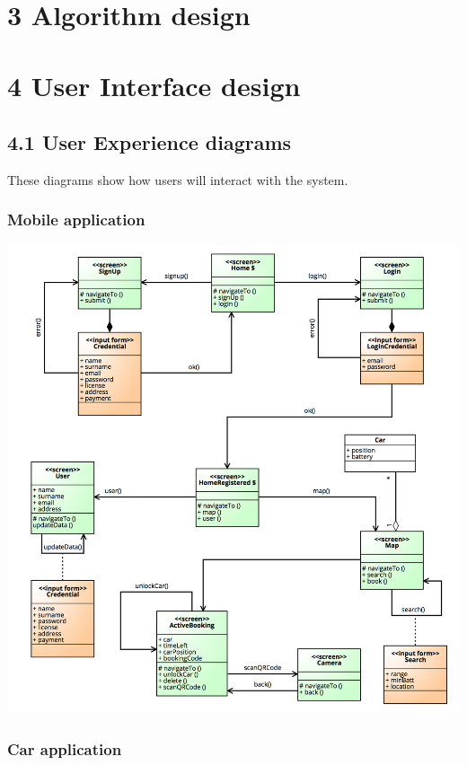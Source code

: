 \documentclass[]{article}
\begin{document}
\section{3 Algorithm design}\label{algorithm-design}

\section{4 User Interface design}\label{user-interface-design}

\subsection{4.1 User Experience
diagrams}\label{user-experience-diagrams}

These diagrams show how users will interact with the system.

\subsubsection{Mobile application}\label{mobile-application-1}

\centerline{\includegraphics{./images/UX_Mobile.png}}

\subsubsection{Car application}\label{car-application}
\end{document}
